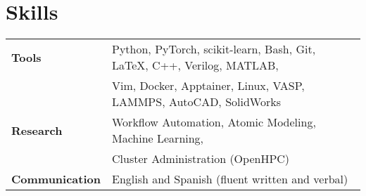 \section{Skills}

\begin{tabular}{p{15em} p{40em}}
\textbf{Tools}         & Python, PyTorch, scikit-learn, Bash, Git, \LaTeX, C++, Verilog, MATLAB, \\
                       & Vim, Docker, Apptainer, Linux, VASP, LAMMPS, AutoCAD, SolidWorks \\
\textbf{Research}      & Workflow Automation, Atomic Modeling, Machine Learning, \\ 
                       & Cluster Administration (OpenHPC) \\
\textbf{Communication} & English and Spanish (fluent written and verbal)
\end{tabular}
